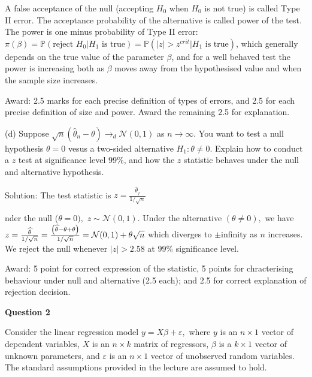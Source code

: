\documentclass{article}
\begin{document}
A false acceptance of the null (accepting $H_{0}$ when $H_{0}$ is not true)
is called Type II error. The acceptance probability of the alternative is
called power of the test. The power is one minus probability of Type II
error: $\pi \left( \beta \right) =\mathbb{P}\left( \text{reject }H_{0}|H_{1}%
\text{ is true}\right) =\mathbb{P}\left( \left\vert z\right\vert
>z^{crit}|H_{1}\text{ is true}\right) $, which generally depends on the true
value of the parameter $\beta $, and for a well behaved test the power is
increasing both as $\beta $ moves away from the hypothesised value and when
the sample size increases.

\bigskip

Award: 2.5 marks for each precise definition of types of errors, and 2.5 for
each precise definition of size and power. Award the remaining 2.5 for
explanation.

(d) Suppose $\sqrt{n}\left( \hat{\theta}_{n}-\theta \right) \rightarrow _{d}%
\mathcal{N}\left( 0,1\right) $ as $n\rightarrow \infty .$ You want to test a
null hypothesis $\theta =0$ vesus a two-sided alternative $H_{1}:\theta \neq
0.$ Explain how to conduct a $z$ test at significance level $99\%$, and how
the $z$ statistic behaves under the null and alternative hypothesis.

\bigskip

Solution: The test statistic is $z=\frac{\widehat{\theta }_{j}}{1/\sqrt{n}}$

nder the null ($\theta =0),$ $z\sim \mathcal{N}(0,1).$
Under the alternative $(\theta \neq 0),$ we have $z=\frac{\widehat{\theta }}{%
1/\sqrt{n}}=\frac{\left( \widehat{\theta }-\theta +\theta \right) }{1/\sqrt{n%
}}=\mathcal{N}(0,1)+\theta \sqrt{n}$ which diverges to $\pm $infinity as $n$
increases. We reject the null whenever $\left\vert z\right\vert >2.58$ at $%
99\%$ significance level.

Award: 5 point for correct expression of the statistic, 5 points for
chracterising behaviour under null and alternative (2.5 each); and 2.5 for
correct explanation of rejection decision. \bigskip

\textbf{Question 2}

Consider the linear regression model $y=X\beta +\varepsilon ,$ where $y$ is
an $n\times 1$ vector of dependent variables, $X$ is an $n\times k$ matrix
of regressors, $\beta $ is a $k\times 1$ vector of unknown parameters, and $%
\varepsilon $ is an $n\times 1$ vector of unobserved random variables. The
standard assumptions provided in the lecture are assumed to hold.
\end{document}
